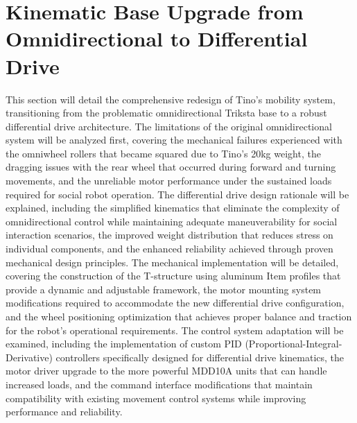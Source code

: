 \section{Kinematic Base Upgrade from Omnidirectional to Differential Drive}
This section will detail the comprehensive redesign of Tino's mobility system, transitioning from the problematic omnidirectional Triksta base to a robust differential drive architecture. The limitations of the original omnidirectional system will be analyzed first, covering the mechanical failures experienced with the omniwheel rollers that became squared due to Tino's 20kg weight, the dragging issues with the rear wheel that occurred during forward and turning movements, and the unreliable motor performance under the sustained loads required for social robot operation. The differential drive design rationale will be explained, including the simplified kinematics that eliminate the complexity of omnidirectional control while maintaining adequate maneuverability for social interaction scenarios, the improved weight distribution that reduces stress on individual components, and the enhanced reliability achieved through proven mechanical design principles. The mechanical implementation will be detailed, covering the construction of the T-structure using aluminum Item profiles that provide a dynamic and adjustable framework, the motor mounting system modifications required to accommodate the new differential drive configuration, and the wheel positioning optimization that achieves proper balance and traction for the robot's operational requirements. The control system adaptation will be examined, including the implementation of custom PID (Proportional-Integral-Derivative) controllers specifically designed for differential drive kinematics, the motor driver upgrade to the more powerful MDD10A units that can handle increased loads, and the command interface modifications that maintain compatibility with existing movement control systems while improving performance and reliability.

